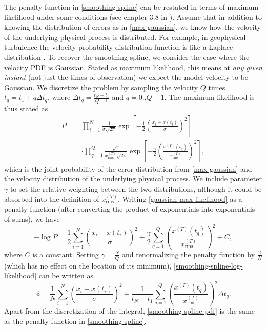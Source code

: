 \documentclass{ametsoc}
\begin{document}
The penalty function in \eqref{smoothing-spline} can be restated in terms of maximum likelihood under some conditions (see chapter 3.8 in \citet{green1994-book}). Assume that in addition to knowing the distribution of errors as in \eqref{max-gaussian}, we know how the velocity of the underlying physical process is distributed. For example, in geophysical turbulence the velocity probability distribution function is like a Laplace distribution \citep{bracco2000-pf}. To recover the smoothing spline, we consider the case where the velocity PDF is Gaussian. Stated as maximum likelihood, this means at \emph{any given instant} (not just the times of observation) we expect the model velocity to be Gaussian. We discretize the problem by sampling the velocity $Q$ times $t_q = t_1 + q \Delta t_q$, where $\Delta t_q=\frac{t_N-t_1}{Q-1}$ and $q=0..Q-1$. The maximum likelihood is thus stated as
\begin{align}
P =  & \prod^N _{i=1}\frac{1}{\sigma \sqrt{2 \pi}}\exp \left[ -\frac{1}{2} \left( \frac{x_i - x(t_i)}{\sigma} \right)^2 \right] \nonumber \\ &  \cdot  \prod^{Q}_{q=1}\frac{\sqrt{\gamma}}{x^{(T)}_{\textrm{rms}} \sqrt{2 \pi}} \exp \left[  - \frac{\gamma}{2} \left(  \frac{x^{(T)}(t_q)}{x^{(T)}_{\textrm{rms}}} \right)^2 \right],
\label{gaussian-max-likelihood}
\end{align}
which is the joint probability of the error distribution from \eqref{max-gaussian} and the velocity distribution of the underlying physical process. We include parameter $\gamma$ to set the relative weighting between the two distributions, although it could be absorbed into the definition of $x^{(T)}_{\textrm{rms}}$. Writing \eqref{gaussian-max-likelihood} as a penalty function (after converting the product of exponentials into exponentials of sums), we have
\begin{equation}
-\log P= \frac{1}{2}\sum^N _{i=1}  \left( \frac{x_i - x(t_i)}{\sigma} \right)^2 + \frac{\gamma}{2} \sum^{Q}_{q=1} \left( \frac{x^{(T)}(t_q)}{x^{(T)}_{\textrm{rms}}} \right)^2 + C,
\label{smoothing-spline-log-likelihood}
\end{equation}
where $C$ is a constant. Setting $\gamma=\frac{N}{Q}$ and renormalizing the penalty function by $\frac{2}{N}$ (which has no effect on the location of its minimum), \eqref{smoothing-spline-log-likelihood} can be written as
\begin{equation}
\label{smoothing-spline-pdf}
\phi = \frac{1}{N} \sum^N _{i=1}  \left( \frac{x_i - x(t_i)}{\sigma} \right)^2 + \frac{1}{t_N-t_1} \sum^{Q}_{q=1}  \left(  \frac{x^{(T)}(t_q)}{x^{(T)}_{\textrm{rms}}} \right)^2 \Delta t_q.
\end{equation}
Apart from the discretization of the integral, \eqref{smoothing-spline-pdf} is the same as the penalty function in \eqref{smoothing-spline}.
\end{document}
